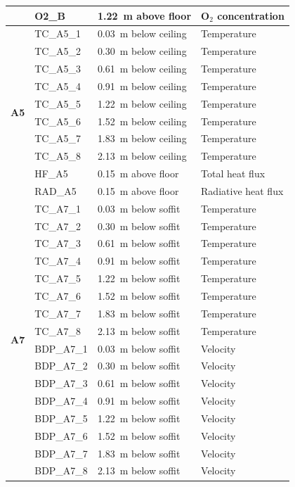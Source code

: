 \documentclass[12pt,oneside]{book}
\begin{document}
\begin{longtable}[c]{c|lll}
 & O2\_B      & 1.22~m above floor   & O$_2$ concentration \\
\midrule
\multirow{10}{*}{\large{\textbf{A5}}}
 & TC\_A5\_1  & 0.03~m below ceiling & Temperature \\
 & TC\_A5\_2  & 0.30~m below ceiling & Temperature \\
 & TC\_A5\_3  & 0.61~m below ceiling & Temperature \\
 & TC\_A5\_4  & 0.91~m below ceiling & Temperature \\
 & TC\_A5\_5  & 1.22~m below ceiling & Temperature \\
 & TC\_A5\_6  & 1.52~m below ceiling & Temperature \\
 & TC\_A5\_7  & 1.83~m below ceiling & Temperature \\
 & TC\_A5\_8  & 2.13~m below ceiling & Temperature \\
\cline{2-4}
 & HF\_A5	  & 0.15~m above floor   & Total heat flux \\
 & RAD\_A5    & 0.15~m above floor   & Radiative heat flux \\
\midrule
\multirow{16}{*}{\large{\textbf{A7}}}
 & TC\_A7\_1  & 0.03~m below soffit  & Temperature \\
 & TC\_A7\_2  & 0.30~m below soffit  & Temperature \\
 & TC\_A7\_3  & 0.61~m below soffit  & Temperature \\
 & TC\_A7\_4  & 0.91~m below soffit  & Temperature \\
 & TC\_A7\_5  & 1.22~m below soffit  & Temperature \\
 & TC\_A7\_6  & 1.52~m below soffit  & Temperature \\
 & TC\_A7\_7  & 1.83~m below soffit  & Temperature \\
 & TC\_A7\_8  & 2.13~m below soffit  & Temperature \\
\cline{2-4}
 & BDP\_A7\_1 & 0.03~m below soffit  & Velocity \\
 & BDP\_A7\_2 & 0.30~m below soffit  & Velocity \\
 & BDP\_A7\_3 & 0.61~m below soffit  & Velocity \\
 & BDP\_A7\_4 & 0.91~m below soffit  & Velocity \\
 & BDP\_A7\_5 & 1.22~m below soffit  & Velocity \\
 & BDP\_A7\_6 & 1.52~m below soffit  & Velocity \\
 & BDP\_A7\_7 & 1.83~m below soffit  & Velocity \\
 & BDP\_A7\_8 & 2.13~m below soffit  & Velocity \\

\end{longtable}
\end{document}
